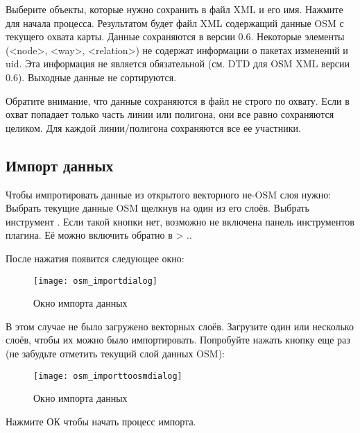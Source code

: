 Выберите объекты, которые нужно сохранить в файл XML и его имя. Нажмите
 для начала процесса. Результатом будет файл XML содержащий
данные OSM с текущего охвата карты. Данные сохраняются в версии 0.6.
Некоторые элементы (<node>, <way>, <relation>) не содержат информации о
пакетах изменений и uid. Эта информация не является обязательной (см.
DTD для OSM XML версии 0.6). Выходные данные не сортируются.

Обратите внимание, что данные сохраняются в файл не строго по охвату.
Если в охват попадает только часть линии или полигона, они все равно
сохраняются целиком. Для каждой линии/полигона сохраняются все ее
участники.

\subsection{Импорт данных}

Чтобы импротировать данные из открытого векторного не-OSM слоя нужно:
Выбрать текущие данные OSM щелкнув на один из его слоёв. Выбрать
инструмент . Если
такой кнопки нет, возможно не включена панель инструментов плагина. Её
можно включить обратно в  \arrow {}
> ..

После нажатия появится следующее окно:

\begin{figure}[ht]
   \centering
   \texttt{[image: osm\_importdialog]}
   \caption{Окно импорта данных \nixcaption}\label{fig:osmimportmessage}
\end{figure}

В этом случае не было загружено векторных слоёв. Загрузите один или
несколько слоёв, чтобы их можно было импортировать. Попробуйте нажать
кнопку еще раз (не забудьте отметить текущий слой данных OSM):

\begin{figure}[ht]
   \centering
   \texttt{[image: osm\_importtoosmdialog]}
   \caption{Окно импорта данных \nixcaption}\label{fig:osmimporttoosm}
\end{figure}

Нажмите ОК чтобы начать процесс импорта.

\FloatBarrier

